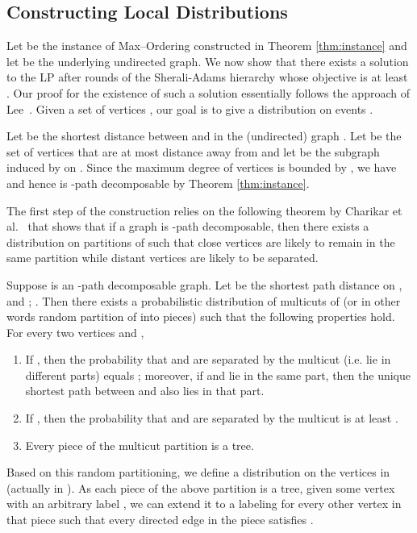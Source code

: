 \documentclass[oribibl]{llncs}
\newcommand{\maxk}{{\sc Max--Ordering}\xspace}
\begin{document}
\subsection{Constructing Local Distributions}
\label{sec:constr-local-distr}

Let  be the instance of \maxk constructed in Theorem
\ref{thm:instance} and let  be the underlying undirected
graph. We now show that there exists a solution to the LP after  
rounds of the Sherali-Adams hierarchy whose objective is at
least . Our proof for the existence of
such a solution essentially follows the approach of 
Lee~\cite{lee2014hardness}.  
Given a set of  vertices , our goal is to give a distribution on
events .

Let  be the shortest distance between  and  in the
(undirected) graph . Let  be the set of vertices that
are at most  distance away from  and let  be the subgraph
induced by  on . Since the maximum degree of vertices is
bounded by , we have  and hence 
is -path decomposable by Theorem \ref{thm:instance}.

The first step of the construction relies on the following theorem by
Charikar et al.~\cite{charikar2010local} that shows that if a graph
 is -path decomposable, then there exists a distribution on
partitions of  such that close vertices are likely to remain in the
same partition while distant vertices are likely to be separated. 

\begin{theorem}
\label{thm:cmmmulticut}
Suppose  is an -path decomposable graph. Let
 be the shortest path distance on  , and ; . Then there exists a
probabilistic distribution of multicuts of  (or in other words
random partition of  into pieces) such that the following
properties hold. For every two vertices  and , 
\begin{enumerate}
	\item If , then the probability that  and
		 are separated by the multicut (i.e. lie in
		different parts) equals ;
		moreover, if  and  lie in the same part, then
		the unique shortest path between  and  also lies
		in that part.  
	\item If , then the probability that  and 
		 are separated by the multicut is at least 
		.  
	\item Every piece of the multicut partition is a tree.  
\end{enumerate} 
\end{theorem}
Based on this random partitioning, we define a distribution on the
vertices in  (actually in ). As each piece of the above
partition is a tree, given some vertex  with an arbitrary label
, we can extend it to a labeling  for 
every other vertex in that piece such that every
directed edge  in the piece satisfies .
\end{document}
